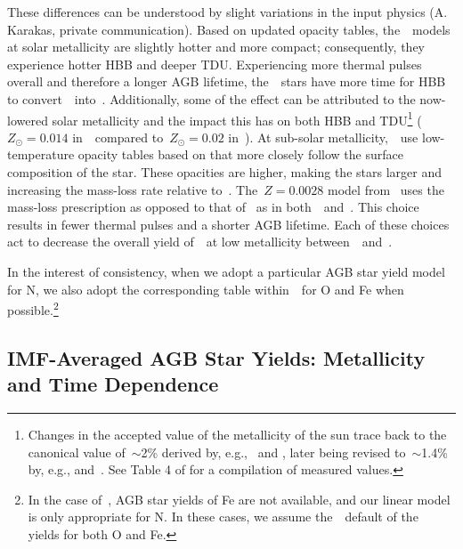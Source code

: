 \documentclass[ms.tex]{subfiles}
\begin{document}
These differences can be understood by slight variations in the input physics
(A. Karakas, private communication).
Based on updated opacity tables, the~\karakas~models at solar metallicity are
slightly hotter and more compact; consequently, they experience hotter HBB and
deeper TDU.
Experiencing more thermal pulses overall and therefore a longer AGB lifetime,
the~\karakas~stars have more time for HBB to convert~\Ctwelve~into~\Nfourteen.
Additionally, some of the effect can be attributed to the now-lowered solar
metallicity and the impact this has on both HBB and TDU\footnote{
	Changes in the accepted value of the metallicity of the sun trace back to
	the canonical value of~$\sim$2\% derived by, e.g.,~\citet{Anders1989} and
	\citet{Grevesse1998}, later being revised to~$\sim$1.4\% by, e.g.,
	\citet{Lodders2003} and~\citet*{Asplund2005}. See Table 4 of
	\citet{Asplund2009} for a compilation of measured values.
} ($Z_\odot = 0.014$ in~\karakas~compared to~$Z_\odot = 0.02$ in~\karakasten).
At sub-solar metallicity,~\karakas~use low-temperature opacity tables based on
\citet{Marigo2002} that more closely follow the surface composition of the
star.
These opacities are higher, making the stars larger and increasing the
mass-loss rate relative to~\karakasten.
The~$Z = 0.0028$ model from~\citet{Karakas2018} uses the~\citet{Bloecker1995}
mass-loss prescription as opposed to that of~\citet{Vassiliadis1993} as in
both~\citet{Karakas2010}~and~\citet{Karakas2016}.
This choice results in fewer thermal pulses and a shorter AGB lifetime.
Each of these choices act to decrease the overall yield of~\Nfourteen~at low
metallicity between~\karakasten~and~\karakas.
\par
In the interest of consistency, when we adopt a particular AGB star yield model
for N, we also adopt the corresponding table within~\vice~for O and Fe when
possible.\footnote{
	In the case of~\citet{Ventura2013, Ventura2014, Ventura2018, Ventura2020},
	AGB star yields of Fe are not available, and our linear model is only
	appropriate for N.
	In these cases, we assume the~\vice~default of the~\citet{Cristallo2011,
	Cristallo2015} yields for both O and Fe.
}

\subsection{IMF-Averaged AGB Star Yields: Metallicity and Time Dependence}
\label{sec:yields:imf_agb}
\end{document}
